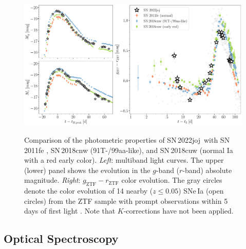 \documentclass[twocolumn]{aastex631}
\newcommand{\sn}{SN\,2022joj}
\begin{document}
\begin{CJK*}{UTF8}{gbsn}
\begin{figure}
    \centering
    \includegraphics[width=\textwidth]{photometry.pdf}
    \label{fig:lc}
    \caption{Comparison of the photometric properties of \sn\ with SN\,2011fe \citep[normal Ia;][]{Pereira_2013}, SN\,2018cnw (91T-/99aa-like), and SN\,2018cuw (normal Ia with a red early color). \textit{Left}: multiband light curves. The upper (lower) panel shows the evolution in the $g$-band ($r$-band) absolute magnitude. %
    \textit{Right}: $g_\mathrm{ZTF}-r_\mathrm{ZTF}$ color evolution. %
    The gray circles denote the color evolution of 14 nearby ($z\le0.05$) SNe\,Ia (open circles) from the ZTF sample with prompt observations within 5\,days of first light \citep{Bulla2020}. Note that $K$-corrections have not been applied.}
\end{figure}

\subsection{Optical Spectroscopy}\label{sec:optical_spec}


\end{CJK*}
\end{document}
